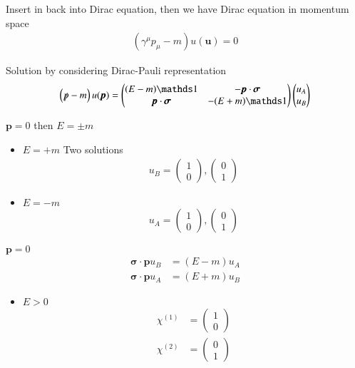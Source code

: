 Insert in back into Dirac equation, then we have Dirac equation in momentum space
\begin{align}
   \left( \gamma^\mu p_\mu - m \right) u(\pmb{u}) = 0
\end{align}

Solution by considering Dirac-Pauli representation
\begin{align*}
   \left( \slashed{p} - m \right) u(\pmb{p}) = \begin{pmatrix} (E-m) \id & - \pmb{p} \cdot \pmb{\sigma} \\ \pmb{p} \cdot \pmb{\sigma} & -(E+m) \id \end{pmatrix} 
   \begin{pmatrix} u_A \\ u_B\end{pmatrix}
\end{align*}

$\pmb{p} = 0$ then $E = \pm m$

\begin{itemize}
   \item $E = +m$ Two solutions 
      \begin{align*}
         u_B = \begin{pmatrix} 1 \\ 0 \end{pmatrix} , \begin{pmatrix} 0 \\ 1\end{pmatrix}
      \end{align*}

   \item $E=-m$
      \begin{align*}
         u_A = \begin{pmatrix} 1 \\ 0\end{pmatrix}, \begin{pmatrix} 0 \\ 1\end{pmatrix}
      \end{align*}
\end{itemize}

$\pmb{p} = 0$
\begin{align}
   \pmb{\sigma} \cdot \pmb{p} u_B &= (E-m) u_A \\
   \pmb{\sigma} \cdot \pmb{p} u_A &= (E+m) u_B
\end{align}

\begin{itemize}
   \item $E>0$ 
      \begin{align*}
         \chi^{(1)} &= \begin{pmatrix} 1 \\ 0\end{pmatrix} \\
         \chi^{(2)} &= \begin{pmatrix} 0 \\ 1\end{pmatrix}
      \end{align*}
\end{itemize}

